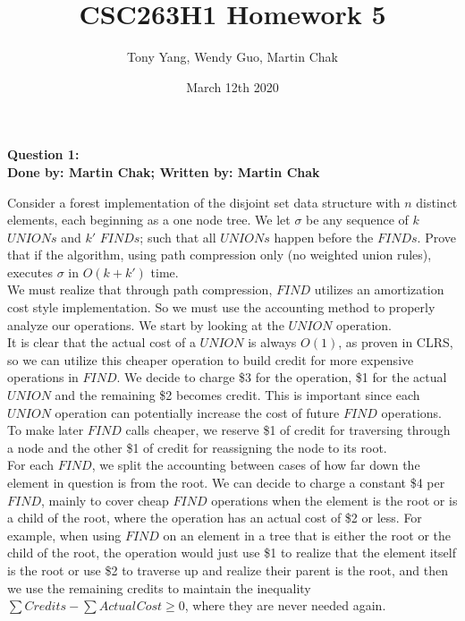 \documentclass[20pt]{article}
\title{CSC263H1 Homework 5}
\author{Tony Yang, Wendy Guo, Martin Chak}
\date{March 12th 2020}
\begin{document}

\maketitle


\newpage


\noindent
\textbf{Question 1:}\\
\textbf{Done by: Martin Chak; Written by: Martin Chak}\\

\noindent
\begin{text}
    Consider a forest implementation of the disjoint set data structure with $n$ distinct elements, each beginning as a one node tree. We let $\sigma$ be any sequence of $k$ $UNIONs$ and $k'$ $FINDs$; such that all $UNIONs$ happen before the $FINDs$. Prove that if the algorithm, using path compression only (no weighted union rules), executes $\sigma$ in $O(k + k')$ time.\\
    
    \noindent
    We must realize that through path compression, $FIND$ utilizes an amortization cost style implementation. So we must use the accounting method to properly analyze our operations. We start by looking at the $UNION$ operation.\\
    
    \noindent
    It is clear that the actual cost of a $UNION$ is always $O(1)$, as proven in CLRS, so we can utilize this cheaper operation to build credit for more expensive operations in $FIND$. We decide to charge \$3 for the operation, \$1 for the actual $UNION$ and the remaining \$2 becomes credit. This is important since each $UNION$ operation can potentially increase the cost of future $FIND$ operations. To make later $FIND$ calls cheaper, we reserve \$1 of credit for traversing through a node and the other \$1 of credit for reassigning the node to its root.\\
    
    \noindent
    For each $FIND$, we split the accounting between cases of how far down the element in question is from the root. We can decide to charge a constant \$4 per $FIND$, mainly to cover cheap $FIND$ operations when the element is the root or is a child of the root, where the operation has an actual cost of \$2 or less. For example, when using $FIND$ on an element in a tree that is either the root or the child of the root, the operation would just use \$1 to realize that the element itself is the root or use \$2 to traverse up and realize their parent is the root, and then we use the remaining credits to maintain the inequality $\sum Credits - \sum Actual_{}Cost \geq 0$, where they are never needed again. \\
    

\end{text}
\end{document}
